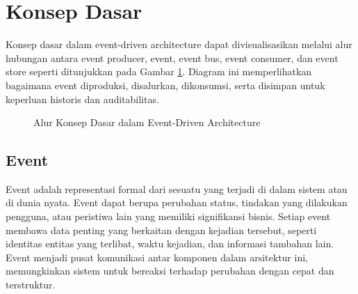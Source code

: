 \section{Konsep Dasar}

Konsep dasar dalam event-driven architecture dapat divisualisasikan melalui alur hubungan antara event producer, event, event bus, event consumer, dan event store seperti ditunjukkan pada Gambar \ref{fig:konsep-dasar-eda}. Diagram ini memperlihatkan bagaimana event diproduksi, disalurkan, dikonsumsi, serta disimpan untuk keperluan historis dan auditabilitas.

\begin{figure}[h]
	\centering
	\caption{Alur Konsep Dasar dalam Event-Driven Architecture}
	\label{fig:konsep-dasar-eda}
\end{figure}



\subsection{Event}
Event adalah representasi formal dari sesuatu yang terjadi di dalam sistem atau di dunia nyata. Event dapat berupa perubahan status, tindakan yang dilakukan pengguna, atau peristiwa lain yang memiliki signifikansi bisnis. Setiap event membawa data penting yang berkaitan dengan kejadian tersebut, seperti identitas entitas yang terlibat, waktu kejadian, dan informasi tambahan lain. Event menjadi pusat komunikasi antar komponen dalam arsitektur ini, memungkinkan sistem untuk bereaksi terhadap perubahan dengan cepat dan terstruktur.


